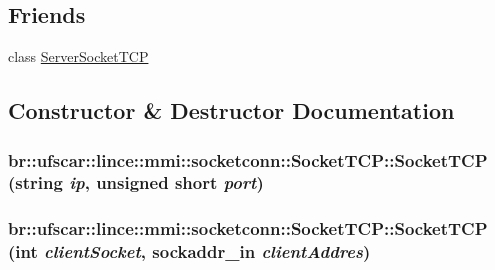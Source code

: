 \subsection*{Friends}
\begin{DoxyCompactItemize}
\item 
class \hyperlink{classbr_1_1ufscar_1_1lince_1_1mmi_1_1socketconn_1_1SocketTCP_a1fb2b529851e5c95e720a67fbc1aaaa1}{ServerSocketTCP}
\end{DoxyCompactItemize}


\subsection{Constructor \& Destructor Documentation}
\hypertarget{classbr_1_1ufscar_1_1lince_1_1mmi_1_1socketconn_1_1SocketTCP_a98f391c314ca7210a8cdcfc666307540}{
\subsubsection[{SocketTCP}]{\setlength{\rightskip}{0pt plus 5cm}br::ufscar::lince::mmi::socketconn::SocketTCP::SocketTCP (string {\em ip}, \/  unsigned short {\em port})}}
\label{classbr_1_1ufscar_1_1lince_1_1mmi_1_1socketconn_1_1SocketTCP_a98f391c314ca7210a8cdcfc666307540}
\hypertarget{classbr_1_1ufscar_1_1lince_1_1mmi_1_1socketconn_1_1SocketTCP_a9df5b18236cbacc41a53d9d4fc320a8a}{
\subsubsection[{SocketTCP}]{\setlength{\rightskip}{0pt plus 5cm}br::ufscar::lince::mmi::socketconn::SocketTCP::SocketTCP (int {\em clientSocket}, \/  sockaddr\_\-in {\em clientAddres})}}
\label{classbr_1_1ufscar_1_1lince_1_1mmi_1_1socketconn_1_1SocketTCP_a9df5b18236cbacc41a53d9d4fc320a8a}


